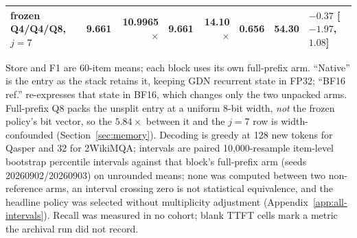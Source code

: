 \begin{table}[t]
\begin{tabular}{@{}lrrrrrrl@{}}
\qcomem{} frozen Q4/Q4/Q8, $j=7$ & 9.661 & 10.9965$\times$ & 9.661 & 14.10$\times$ & 0.656 & 54.30 & $-0.37$ [$-1.97$, $1.08$] \\
\bottomrule
\end{tabular}
\vspace{0.5mm}
\parbox{0.97\textwidth}{\scriptsize Store and F1 are 60-item means; each block uses its own full-prefix arm.
``Native'' is the entry as the stack retains it, keeping GDN recurrent state in
FP32; ``BF16 ref.'' re-expresses that state in BF16, which changes only the two
unpacked arms.  Full-prefix Q8 packs the unsplit entry at a uniform 8-bit width,
\emph{not} the frozen policy's bit vector, so the $5.84\times$ between it and
the $j=7$ row is width-confounded (Section~\ref{sec:memory}).  Decoding is
greedy at 128 new tokens for Qasper and 32 for 2WikiMQA; intervals are paired
10,000-resample item-level bootstrap percentile intervals against that block's
full-prefix arm (seeds 20260902/20260903) on unrounded means; none was computed
between two non-reference arms, an interval crossing zero is not statistical
equivalence, and the headline policy was selected without multiplicity
adjustment (Appendix~\ref{app:all-intervals}).  Recall was measured in no
cohort; blank TTFT cells mark a metric the archival run did not record.}
\end{table}
